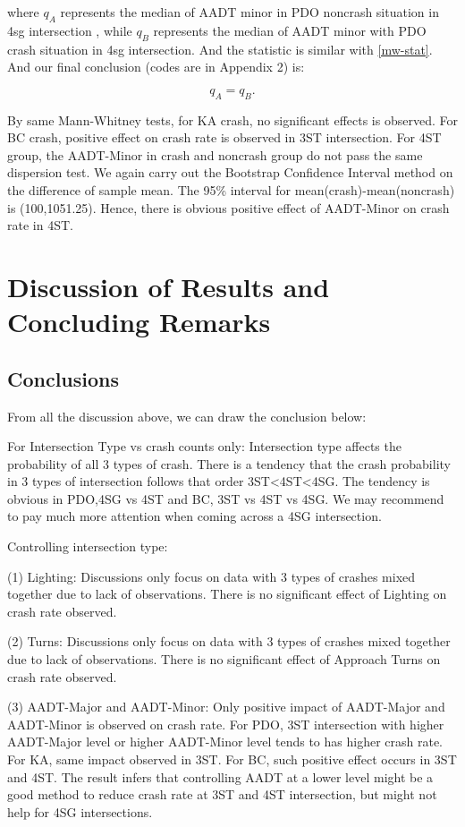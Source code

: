 \documentclass[11pt]{scrartcl} %
\begin{document}
where $q_A$ represents the median of AADT minor in PDO noncrash situation in 4sg intersection , while $q_B$ represents the median of AADT minor with PDO crash situation in 4sg intersection. And the statistic is similar with \eqref{mw-stat}. And our final conclusion (codes are in Appendix 2) is:

\begin{equation*}
{q_A} = {q_B}.
\end{equation*}

By same Mann-Whitney tests, for KA crash, no significant effects is observed. For BC crash, positive effect on crash rate is observed in 3ST intersection. For 4ST group, the AADT-Minor in crash and noncrash group do not pass the same dispersion test. We again carry out the Bootstrap Confidence Interval method on the difference of sample mean. The 95\% interval for mean(crash)-mean(noncrash) is (100,1051.25). Hence, there is obvious positive effect of AADT-Minor on crash rate in 4ST.

\section{Discussion of Results and Concluding Remarks}

\subsection{Conclusions}

From all the discussion above, we can draw the conclusion below:

For Intersection Type vs crash counts only: Intersection type affects the probability of all 3 types of crash. There is a tendency that the crash probability in 3 types of intersection follows that order 3ST<4ST<4SG. The tendency is obvious in PDO,4SG vs 4ST and BC, 3ST vs 4ST vs 4SG. We may recommend to pay much more attention when coming across a 4SG intersection.

Controlling intersection type:

(1) Lighting: Discussions only focus on data with 3 types of crashes mixed together due to lack of observations. There is no significant effect of Lighting on crash rate observed.

(2) Turns: Discussions only focus on data with 3 types of crashes mixed together due to lack of observations. There is no significant effect of Approach Turns on crash rate observed.

(3) AADT-Major and AADT-Minor: Only positive impact of AADT-Major and AADT-Minor is observed on crash rate. For PDO, 3ST intersection with higher AADT-Major level or higher AADT-Minor level tends to has higher crash rate. For KA, same impact observed in 3ST. For BC, such positive effect occurs in 3ST and 4ST. The result infers that controlling AADT at a lower level might be a good method to reduce crash rate at 3ST and 4ST intersection, but might not help for 4SG intersections.
\end{document}
